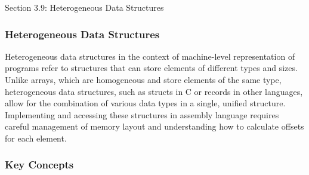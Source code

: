 \begin{notes}{Section 3.9: Heterogeneous Data Structures}
    \subsubsection*{Heterogeneous Data Structures}

    Heterogeneous data structures in the context of machine-level representation of programs refer to structures that can store elements of different types and sizes. Unlike arrays, which are homogeneous 
    and store elements of the same type, heterogeneous data structures, such as structs in C or records in other languages, allow for the combination of various data types in a single, unified structure. 
    Implementing and accessing these structures in assembly language requires careful management of memory layout and understanding how to calculate offsets for each element. \vspace*{1em}
    
    \subsubsection*{Key Concepts}
    

\end{notes}
